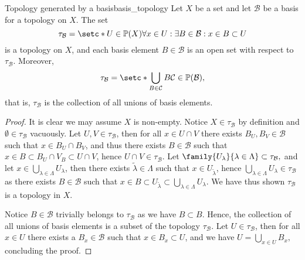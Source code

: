 \begin{proposition}{Topology generated by a basis}{basis_topology}
    Let \(X\) be a set and let \(\mathcal{B}\) be a basis for a topology on \(X\). The set
    \begin{equation*}
        \tau_{\mathcal{B}} = \setc*{U \in \mathbb{P}(X)}{\forall x \in U : \exists B \in \mathcal{B} : x \in B \subset U}
    \end{equation*}
    is a topology on \(X\), and each basis element \(B \in \mathcal{B}\) is an open set with respect to \(\tau_{\mathcal{B}}\). Moreover, 
    \begin{equation*}
        \tau_{\mathcal{B}} = \setc*{\bigcup_{B \in \mathcal{C}}{B}}{\mathcal{C} \in \mathbb{P}(\mathcal{B})},
    \end{equation*}
    that is, \(\tau_{\mathcal{B}}\) is the collection of all unions of basis elements.
\end{proposition}
\begin{proof}
    It is clear we may assume \(X\) is non-empty. Notice \(X \in \tau_{\mathcal{B}}\) by definition and \(\emptyset \in \tau_{\mathcal{B}}\) vacuously. Let \(U, V \in \tau_\mathcal{B}\), then for all \(x \in U \cap V\) there exists \(B_U, B_V \in \mathcal{B}\) such that \(x \in B_U \cap B_V\), and thus there exists \(B \in \mathcal{B}\) such that \(x \in B \subset B_U \cap V_B \subset U \cap V\), hence \(U \cap V \in \tau_{\mathcal{B}}\). Let \(\family{U_{\lambda}}{\lambda \in \Lambda} \subset \tau_\mathcal{B},\) and let \(x \in \bigcup_{\lambda \in \Lambda}{U_\lambda}\), then there exists \(\tilde{\lambda} \in \Lambda\) such that \(x \in U_{\tilde{\lambda}}\), hence \(\bigcup_{\lambda \in \Lambda}{U_\lambda} \in \tau_{\mathcal{B}}\) as there exists \(B \in \mathcal{B}\) such that \(x \in B \subset U_{\tilde{\lambda}} \subset \bigcup_{\lambda \in \Lambda}{U_\lambda}\). We have thus shown \(\tau_{\mathcal{B}}\) is a topology in \(X\). 

    Notice \(B \in \mathcal{B}\) trivially belongs to \(\tau_{\mathcal{B}}\) as we have \(B \subset B\). Hence, the collection of all unions of basis elements is a subset of the topology \(\tau_{\mathcal{B}}\). Let \(U \in \tau_{\mathcal{B}}\), then for all \(x \in U\) there exists a \(B_x \in \mathcal{B}\) such that \(x \in B_x \subset U\), and we have \(U = \bigcup_{x \in U} B_x,\) concluding the proof.
\end{proof}

